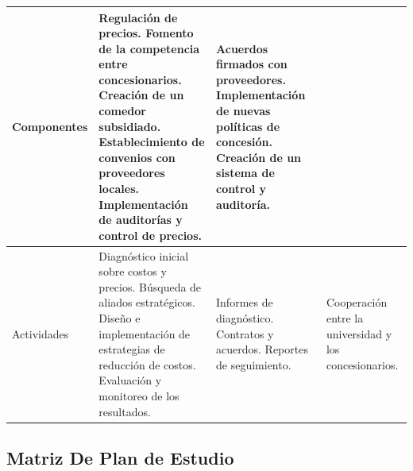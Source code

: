 \documentclass[letterpaper, 11pt]{report}
\begin{document}
\begin{longtable}{|p{.2\linewidth}|p{.2\linewidth}|p{.3\linewidth}|p{.2\linewidth}|}
      Componentes                                                                 & Regulación de precios. Fomento de la competencia entre
      concesionarios. Creación de un comedor subsidiado. Establecimiento de convenios
      con proveedores locales. Implementación de auditorías y control de precios. &
      Acuerdos firmados con proveedores. Implementación de nuevas políticas de
      concesión. Creación de un sistema de control y auditoría.                   &                                                                                                                                   \\\hline

      Actividades                                                                 & Diagnóstico inicial sobre costos y precios. Búsqueda de aliados
      estratégicos. Diseño e implementación de estrategias de reducción de costos.
      Evaluación y monitoreo de los resultados.                                   & Informes de diagnóstico. Contratos
      y acuerdos. Reportes de seguimiento.                                        & Cooperación entre la universidad y los
      concesionarios.                                                                                                                                                                                                 \\\hline

\end{longtable}

\newpage
\subsection{Matriz De Plan de Estudio}
\end{document}
